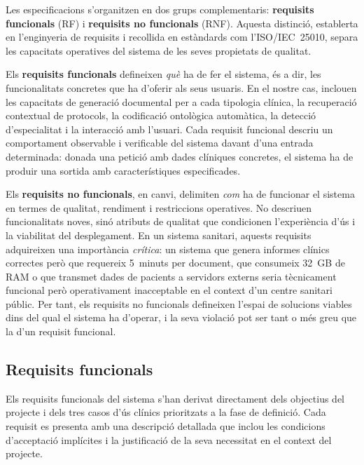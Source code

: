 \documentclass[CAT]{TFUOC}%
\begin{document}
Les especificacions s'organitzen en dos grups complementaris: \textbf{requisits funcionals} (RF) i \textbf{requisits no funcionals} (RNF). Aquesta distinció, establerta en l'enginyeria de requisits i recollida en estàndards com l'ISO/IEC~25010, separa les capacitats operatives del sistema de les seves propietats de qualitat.

Els \textbf{requisits funcionals} defineixen \textit{què} ha de fer el sistema, és a dir, les funcionalitats concretes que ha d'oferir als seus usuaris. En el nostre cas, inclouen les capacitats de generació documental per a cada tipologia clínica, la recuperació contextual de protocols, la codificació ontològica automàtica, la detecció d'especialitat i la interacció amb l'usuari. Cada requisit funcional descriu un comportament observable i verificable del sistema davant d'una entrada determinada: donada una petició amb dades clíniques concretes, el sistema ha de produir una sortida amb característiques especificades.

Els \textbf{requisits no funcionals}, en canvi, delimiten \textit{com} ha de funcionar el sistema en termes de qualitat, rendiment i restriccions operatives. No descriuen funcionalitats noves, sinó atributs de qualitat que condicionen l'experiència d'ús i la viabilitat del desplegament. En un sistema sanitari, aquests requisits adquireixen una importància \textit{crítica}: un sistema que genera informes clínics correctes però que requereix 5~minuts per document, que consumeix 32~GB de RAM o que transmet dades de pacients a servidors externs seria tècnicament funcional però operativament inacceptable en el context d'un centre sanitari públic. Per tant, els requisits no funcionals defineixen l'espai de solucions viables dins del qual el sistema ha d'operar, i la seva violació pot ser tant o més greu que la d'un requisit funcional.

\subsection{Requisits funcionals}

Els requisits funcionals del sistema s'han derivat directament dels objectius del projecte i dels tres casos d'ús clínics prioritzats a la fase de definició. Cada requisit es presenta amb una descripció detallada que inclou les condicions d'acceptació implícites i la justificació de la seva necessitat en el context del projecte.
\end{document}
